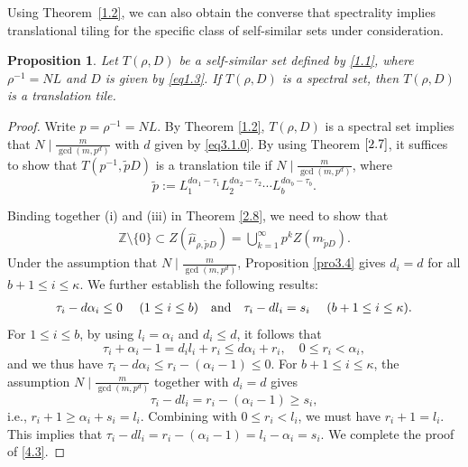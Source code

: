 \documentclass[11pt]{article}
\newtheorem{proposition}[theorem]{Proposition}
\numberwithin{equation}{section}
\begin{document}
Using Theorem~\ref{1.2}, we can also obtain the converse that spectrality implies translational tiling for the specific class of self-similar sets under consideration.

\begin{proposition}\label{cor6.1}
Let $T(\rho,D)$ be a self-similar set defined by \eqref{1.1}, where $\rho^{-1}=NL$ and $D$ is given by \eqref{eq1.3}. If $T(\rho,D)$ is a spectral set, then $T(\rho,D)$ is a translation tile.
\end{proposition}
\begin{proof}
Write $p=\rho^{-1}=NL$. By Theorem \ref{1.2}, $T(\rho,D)$ is a spectral set implies that $N\mid\frac{m}{\gcd(m,p^d)}$  with $d$ given by \eqref{eq3.1.0}. By using Theorem $\ref{2.7}$, it suffices to show that $T(p^{-1},\tilde{p}D)$ is a translation tile if $N\mid\frac{m}{\gcd(m,p^d)}$, where
$$\tilde{p}:=L_1^{d\alpha_1-\tau_1}L_2^{d\alpha_2-\tau_2}\cdots L_b^{d\alpha_b-\tau_b}.$$

Binding together (i) and (iii) in Theorem \ref{2.8}, we need to show that
	\begin{align}\label{4.1}
		\mathbb{Z} \setminus \{0\} \subset Z(\hat{\mu}_{\rho,\tilde{p}D})=\bigcup^{\infty}_{k=1}p^kZ(m_{\tilde{p}D}).
	\end{align}
	Under the assumption that $N\mid\frac{m}{\gcd(m,p^d)}$, Proposition \ref{pro3.4} gives $d_i=d$ for all $b+1 \leq i\leq \kappa$. We further establish the following results:
	\begin{align}\label{4.3}
		\tau_i-d\alpha_i\leq 0~~~~(1\leq i\leq b)\quad {\rm{and}} \quad \tau_i-dl_i=s_i~~~~(b+1\leq i\leq \kappa).
	\end{align}
	For $1\leq i\leq b$, by using $l_i=\alpha_i$ and $d_i\leq d$, it follows that
	$$\tau_i + \alpha_i - 1 = d_i l_i + r_i\leq d\alpha_i+r_i, \quad 0\leq r_i<\alpha_i,$$
	and we thus have
	$\tau_i-d\alpha_i\leq r_i-(\alpha_i - 1)\leq 0$.
	For $b+1\leq i\leq \kappa$, the assumption $N\mid\frac{m}{\gcd(m,p^d)}$ together with  $d_i=d$ gives $$\tau_i-dl_i=r_i-(\alpha_i-1)\geq s_i,$$ i.e.,
	$r_i+1\geq \alpha_i+s_i=l_i$. Combining with $0\leq r_i< l_i$,  we must have $r_i+1=l_i$. This implies that
	$\tau_i-dl_i=r_i-(\alpha_i-1)=l_i-\alpha_i=s_i$. We complete the proof of \eqref{4.3}.
	
	
	

\end{proof}
\end{document}
